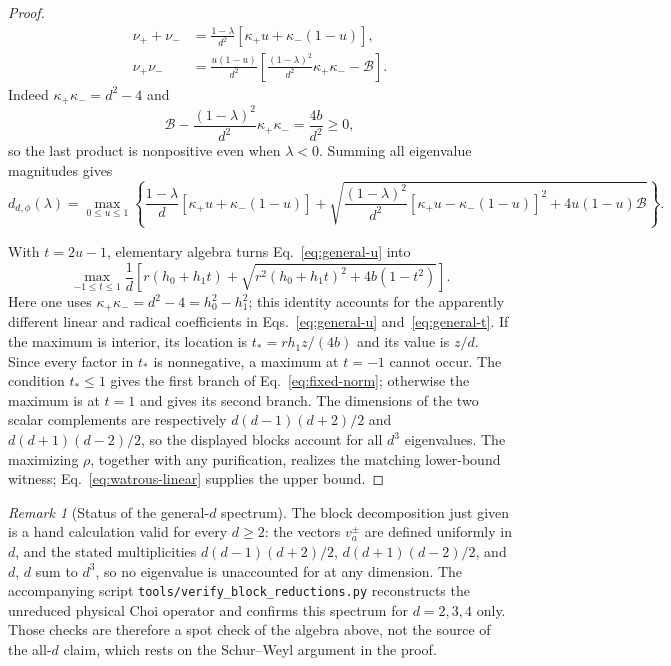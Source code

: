 \documentclass[11pt,a4paper]{article}
\theoremstyle{remark}
\newtheorem{remark}{Remark}
\begin{document}
\begin{proof}
\begin{align}
 \nu_++\nu_-&=\frac{1-\lambda}{d^2}
 [\kappa_+u+\kappa_-(1-u)],\nonumber\\
 \nu_+\nu_-&=\frac{u(1-u)}{d^2}
 \left[\frac{(1-\lambda)^2}{d^2}\kappa_+\kappa_- -\mathcal B\right].
 \label{eq:general-roots}
\end{align}
Indeed $\kappa_+\kappa_-=d^2-4$ and
\[
 \mathcal B-\frac{(1-\lambda)^2}{d^2}\kappa_+\kappa_-
 =\frac{4b}{d^2}\geq0,
\]
so the last product is nonpositive even when $\lambda<0$.  Summing all
eigenvalue magnitudes gives
\begin{equation}
 d_{d,\phi}(\lambda)
 =\max_{0\leq u\leq1}\left\{
 \frac{1-\lambda}{d}[\kappa_+u+\kappa_-(1-u)]
 +\sqrt{\frac{(1-\lambda)^2}{d^2}
 [\kappa_+u-\kappa_-(1-u)]^2+4u(1-u)\mathcal B}
 \right\}.
 \label{eq:general-u}
\end{equation}

With $t=2u-1$, elementary algebra turns Eq.~\eqref{eq:general-u} into
\begin{equation}
 \max_{-1\leq t\leq1}\frac1d\left[
 r(h_0+h_1t)
 +\sqrt{r^2(h_0+h_1t)^2+4b(1-t^2)}
 \right].
 \label{eq:general-t}
\end{equation}
Here one uses
$\kappa_+\kappa_-=d^2-4=h_0^2-h_1^2$; this identity accounts for the
apparently different linear and radical coefficients in
Eqs.~\eqref{eq:general-u} and~\eqref{eq:general-t}.
If the maximum is interior, its location is
$t_*=rh_1z/(4b)$ and its value is $z/d$.  Since every factor in $t_*$ is
nonnegative, a maximum at $t=-1$ cannot occur.  The condition $t_*\leq1$
gives the first branch of Eq.~\eqref{eq:fixed-norm}; otherwise the maximum is
at $t=1$ and gives its second branch.  The dimensions of the two scalar
complements are respectively $d(d-1)(d+2)/2$ and
$d(d+1)(d-2)/2$, so the displayed blocks account for all $d^3$ eigenvalues.
The maximizing $\rho$, together with any purification, realizes the matching
lower-bound witness; Eq.~\eqref{eq:watrous-linear} supplies the upper bound.
\end{proof}

\begin{remark}[Status of the general-$d$ spectrum]
\label{rem:generald}
The block decomposition just given is a hand calculation valid for every
$d\geq2$: the vectors $v_a^\pm$ are defined uniformly in $d$, and the stated
multiplicities $d(d-1)(d+2)/2$, $d(d+1)(d-2)/2$, and $d$, $d$ sum to $d^3$,
so no eigenvalue is unaccounted for at any dimension.  The accompanying
script \texttt{tools/verify\_block\_reductions.py} reconstructs the unreduced
physical Choi operator and confirms this spectrum for $d=2,3,4$ only.  Those
checks are therefore a spot check of the algebra above, not the source of the
all-$d$ claim, which rests on the Schur--Weyl argument in the proof.
\end{remark}
\end{document}
